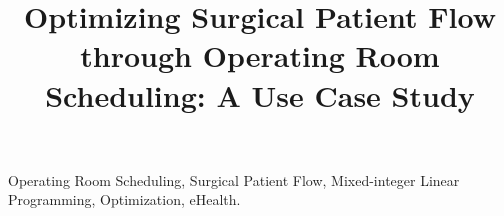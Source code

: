 \documentclass[10pt,conference,a4paper]{IEEEtran}
\begin{document}
\title{
Optimizing Surgical Patient Flow through Operating Room Scheduling: A Use Case Study
}

\maketitle



\IEEEpeerreviewmaketitle

\begin{IEEEkeywords}
Operating Room Scheduling, Surgical Patient Flow, Mixed-integer Linear Programming, Optimization, eHealth.
\end{IEEEkeywords}





% 
\ifCLASSOPTIONcaptionsoff
  \newpage
\fi
\balance


\end{document}
